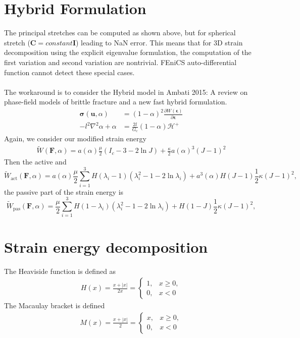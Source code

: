 \documentclass[12pt,3p]{article}
\numberwithin{equation}{section}
\begin{document}
\section{Hybrid Formulation}
The principal stretches can be computed as shown above, but for spherical stretch ($\mathbf{C}= constant \mathbf{I}$) leading to NaN error. This means that for 3D strain decomposition using the explicit eigenvalue formulation, the computation of the first variation and second variation are nontrivial. FEniCS auto-differential function cannot detect these special cases.  \\ \\
The workaround is to consider the Hybrid model in Ambati 2015: A review on phase-field models of brittle fracture and a new fast hybrid formulation.
\begin{align*}
\mathbf{\sigma} (\mathbf{u}, \alpha) &= (1- \alpha)^2 \frac{\partial W (\mathbf{\epsilon})}{\partial \mathbf{\epsilon}} \\
- l^2 \nabla^2 \alpha + \alpha &= \frac{2 l}{G_c} (1-\alpha) \mathcal{H}^+
\end{align*}
Again, we consider our modified strain energy 
\begin{align*}
\widetilde{W} (\mathbf{F}, \alpha) = a(\alpha) \frac{\mu}{2} (I_c - 3 - 2 \ln J) + \frac{\kappa}{2} a(\alpha)^3 (J-1)^2
\end{align*}
Then the active and
\begin{equation}
\widetilde{W}_\text{act}\left(\mathbf{F},\alpha\right)=a(\alpha)\frac{\mu}{2}\sum_{i=1}^{3}H(\lambda_i-1)\left(\lambda_i^2-1-2\ln\lambda_i\right) + a^3(\alpha)H(J-1)\frac{1}{2}\kappa\left(J-1\right)^2,
\end{equation}
the passive part of the strain energy is
\begin{equation}
\widetilde{W}_\text{pas}\left(\mathbf{F},\alpha\right) = \frac{\mu}{2}\sum_{i=1}^{3}H(1-\lambda_i)\left(\lambda_i^2-1-2\ln\lambda_i\right) + H(1-J)\frac{1}{2}\kappa\left(J-1\right)^2,
\end{equation}

\section{Strain energy decomposition}
The Heaviside function is defined as 
\begin{align*}
H(x) = \frac{x + |x|}{2 x} =
\begin{cases}
	1, & x \geq 0, \\
	0, & x < 0	
\end{cases}
\end{align*}
The Macaulay bracket is defined
\begin{align*}
M(x) = \frac{x + |x|}{2} =
\begin{cases}
	x, & x \geq 0, \\
	0, & x < 0	
\end{cases}
\end{align*}
\end{document}
